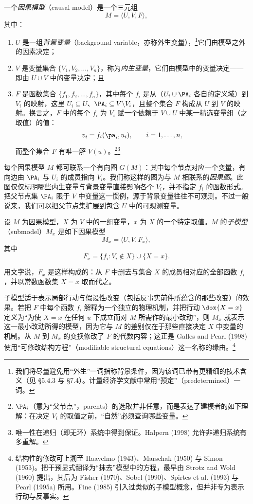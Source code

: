 \begin{definition}[因果模型]
一个\emph{因果模型}（causal model）是一个三元组
\[
M=\langle U,V,F\rangle,
\]
其中：
\begin{enumerate}[label=(\roman*),leftmargin=2.6em]
\item $U$ 是一组\emph{背景变量}（background variable，亦称外生变量），\footnote{我们将尽量避免用“外生”一词指称背景条件，因为该词已带有更精细的技术含义（见 \S 5.4.3 与 \S 7.4）。计量经济学文献中常用“预定”（predetermined）一词。}它们由模型之外的因素决定；
\item $V$ 是变量集合 $\{V_1,V_2,\dots,V_n\}$，称为\emph{内生变量}，它们由模型中的变量决定——即由 $U\cup V$ 中的变量决定；且
\item $F$ 是函数集合 $\{f_1,f_2,\dots,f_n\}$，其中每个 $f_i$ 是从（$U_i\cup\PA_i$ 各自的定义域）到 $V_i$ 的映射，这里 $U_i\subseteq U$、$\PA_i\subseteq V\backslash V_i$，且整个集合 $F$ 构成从 $U$ 到 $V$ 的映射。换言之，$F$ 中的每个 $f_i$ 为 $V_i$ 赋一个依赖于 $V\cup U$ 中某一精选变量组（之取值）的值：
\[
v_i=f_i(\pa_i,u_i),\qquad i=1,\dots,n,
\]
而整个集合 $F$ 有唯一解 $V(u)$。\footnote{$\PA_i$（意为“父节点”，parents）的选取并非任意，而是表达了建模者的如下理解：在决定 $V_i$ 的取值之前，“自然”必须查询哪些变量。}\footnote{唯一性在递归（即无环）系统中得到保证。Halpern (1998) 允许非递归系统有多重解。}
\end{enumerate}
\end{definition}

每个因果模型 $M$ 都可联系一个有向图 $G(M)$：其中每个节点对应一个变量，有向边由 $\PA_i$ 与 $U_i$ 的成员指向 $V_i$。我们称这样的图为与 $M$ 相联系的\emph{因果图}。此图仅仅标明哪些内生变量与背景变量直接影响各个 $V_i$，并不指定 $f_i$ 的函数形式。把父节点集 $\PA_i$ 限于 $V$ 中变量这一惯例，源于背景变量往往不可观测。不过一般说来，我们可以把父节点集扩展到包含 $U$ 中的可观测变量。

\begin{definition}[子模型]
设 $M$ 为因果模型，$X$ 为 $V$ 中的一组变量，$x$ 为 $X$ 的一个特定取值。$M$ 的\emph{子模型}（submodel）$M_x$ 是如下因果模型
\[
M_x=\langle U,V,F_x\rangle,
\]
其中
\begin{equation}
F_x=\{f_i: V_i\notin X\}\cup\{X=x\}. \tag{7.1}
\end{equation}
\end{definition}

用文字说，$F_x$ 是这样构成的：从 $F$ 中删去与集合 $X$ 的成员相对应的全部函数 $f_i$，并以常数函数集 $X=x$ 取而代之。

子模型适于表示局部行动与假设性改变（包括反事实前件所蕴含的那些改变）的效果。若把 $F$ 中每个函数 $f_i$ 解释为一个独立的物理机制，并把行动 $\dox{X=x}$ 定义为“为使 $X=x$ 在任何 $u$ 下成立而对 $M$ 所需作的最小改动”，则 $M_x$ 就表示这一最小改动所得的模型，因为它与 $M$ 的差别仅在于那些直接决定 $X$ 中变量的机制。从 $M$ 到 $M_x$ 的变换修改了 $F$ 的代数内容；这正是 Galles and Pearl (1998) 使用“可修改结构方程”（modifiable structural equations）这一名称的缘由。\footnote{结构性的修改可上溯至 Haavelmo (1943)、Marschak (1950) 与 Simon (1953)。把干预显式翻译为“抹去”模型中的方程，最早由 Strotz and Wold (1960) 提出，其后为 Fisher (1970)、Sobel (1990)、Spirtes et al. (1993) 与 Pearl (1995a) 所用。Fine (1985) 引入过类似的子模型概念，但并非专为表示行动与反事实。}

